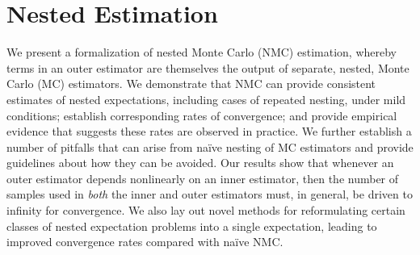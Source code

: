 
\chapter{Nested Estimation}
\label{chp:nest}


We present a formalization of nested Monte Carlo (NMC) estimation, whereby
terms in an outer estimator are themselves the output of separate, nested, Monte Carlo (MC) estimators.
We demonstrate that NMC can provide consistent estimates of 
nested expectations, including cases of repeated nesting, under mild conditions;
establish corresponding rates of convergence;
and provide empirical evidence that suggests these rates are observed in practice.
We further establish a number of pitfalls that can arise from na\"{i}ve nesting of MC estimators
and provide guidelines about how they can be avoided.
Our results show that whenever an outer estimator depends nonlinearly on an inner
estimator, then the number of samples used in \emph{both} the inner and outer estimators
must, in general, be driven to infinity for convergence.  
We also lay out novel methods for reformulating certain classes of nested expectation problems
into a single expectation, leading to improved convergence rates compared with na\"{i}ve NMC.










